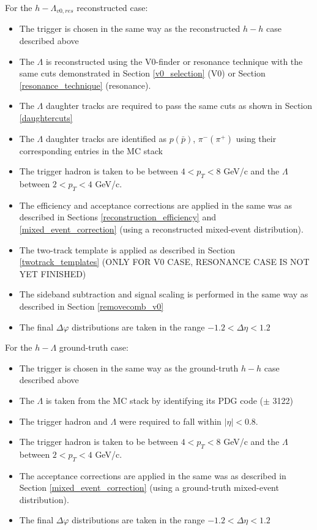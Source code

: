 \documentclass[ALICE,manyauthors]{ALICE_analysis_notes}
\begin{document}
For the $h-\Lambda_{v0, res}$ reconstructed case: 
\begin{itemize}
\item The trigger is chosen in the same way as the reconstructed $h-h$ case described above
\item The $\Lambda$ is reconstructed using the V0-finder or resonance technique with the same cuts demonstrated in Section \ref{v0_selection} (V0) or Section \ref{resonance_technique} (resonance).
\item The $\Lambda$ daughter tracks are required to pass the same cuts as shown in Section \ref{daughtercuts}
\item The $\Lambda$ daughter tracks are identified as $p (\bar{p})$, $\pi^{-} (\pi^{+})$ using their corresponding entries in the MC stack
\item The trigger hadron is taken to be between $4 < p_{T} < 8$ GeV/c and the $\Lambda$ between $2 < p_{T} < 4$ GeV/c. 
\item The efficiency and acceptance corrections are applied in the same was as described in Sections \ref{reconstruction_efficiency} and \ref{mixed_event_correction} (using a reconstructed mixed-event distribution). 
\item The two-track template is applied as described in Section \ref{twotrack_templates} (ONLY FOR V0 CASE, RESONANCE CASE IS NOT YET FINISHED)
\item The sideband subtraction and signal scaling is performed in the same way as described in Section \ref{removecomb_v0} 
\item The final $\Delta\varphi$ distributions are taken in the range $-1.2 < \Delta\eta < 1.2$
\end{itemize}

For the $h-\Lambda$ ground-truth case: 
\begin{itemize}
\item The trigger is chosen in the same way as the ground-truth $h-h$ case described above
\item The $\Lambda$ is taken from the MC stack by identifying its PDG code ($\pm$ 3122)
\item The trigger hadron and $\Lambda$ were required to fall within $|\eta| < 0.8$.
\item The trigger hadron is taken to be between $4 < p_{T} < 8$ GeV/c and the $\Lambda$ between $2 < p_{T} < 4$ GeV/c. 
\item The acceptance corrections are applied in the same was as described in Section \ref{mixed_event_correction} (using a ground-truth mixed-event distribution). 
\item The final $\Delta\varphi$ distributions are taken in the range $-1.2 < \Delta\eta < 1.2$
\end{itemize}
\end{document}
